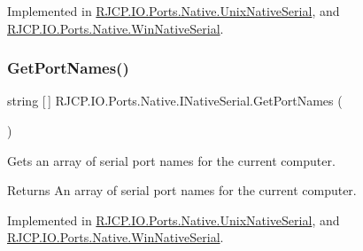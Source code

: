 Implemented in \mbox{\hyperlink{class_r_j_c_p_1_1_i_o_1_1_ports_1_1_native_1_1_unix_native_serial_a7af4a784edae4f0bb517e2cfaa4de348}{R\+J\+C\+P.\+I\+O.\+Ports.\+Native.\+Unix\+Native\+Serial}}, and \mbox{\hyperlink{class_r_j_c_p_1_1_i_o_1_1_ports_1_1_native_1_1_win_native_serial_a8e8c6fdc7f6249e5c6a23fd1d4170b29}{R\+J\+C\+P.\+I\+O.\+Ports.\+Native.\+Win\+Native\+Serial}}.

\mbox{\label{interface_r_j_c_p_1_1_i_o_1_1_ports_1_1_native_1_1_i_native_serial_a5c29356160f31a94f992a9a023a78ff3}} 
\subsubsection{\texorpdfstring{GetPortNames()}{GetPortNames()}}
{\footnotesize\ttfamily string \mbox{[}$\,$\mbox{]} R\+J\+C\+P.\+I\+O.\+Ports.\+Native.\+I\+Native\+Serial.\+Get\+Port\+Names (\begin{DoxyParamCaption}{ }\end{DoxyParamCaption})}



Gets an array of serial port names for the current computer. 

\begin{DoxyReturn}{Returns}
An array of serial port names for the current computer.
\end{DoxyReturn}


Implemented in \mbox{\hyperlink{class_r_j_c_p_1_1_i_o_1_1_ports_1_1_native_1_1_unix_native_serial_a2d9ec0ba3ee965ceea81ba5268f6621b}{R\+J\+C\+P.\+I\+O.\+Ports.\+Native.\+Unix\+Native\+Serial}}, and \mbox{\hyperlink{class_r_j_c_p_1_1_i_o_1_1_ports_1_1_native_1_1_win_native_serial_a880da1abd27221e2c6369668f8408485}{R\+J\+C\+P.\+I\+O.\+Ports.\+Native.\+Win\+Native\+Serial}}.

\mbox{\label{interface_r_j_c_p_1_1_i_o_1_1_ports_1_1_native_1_1_i_native_serial_aee35b004a7e64a44e11271261e635107}} 
